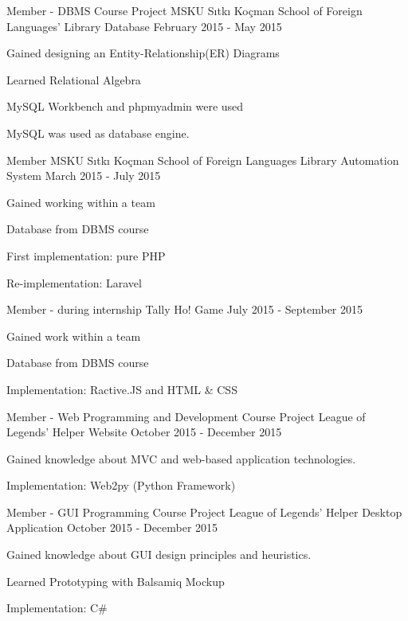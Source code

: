 \begin{cventries}
  \cventry
    {Member - DBMS Course Project}
    {MSKU Sıtkı Koçman School of Foreign Languages' Library Database}
    {}
    {February 2015 - May 2015}
    {
      \begin{cvitems}
        \item {Gained designing an Entity-Relationship(ER) Diagrams}
        \item {Learned Relational Algebra}
        \item {MySQL Workbench and phpmyadmin were used}
        \item {MySQL was used as database engine.}
      \end{cvitems}
    }
  \cventry
    {Member}
    {MSKU Sıtkı Koçman School of Foreign Languages Library Automation System}
    {}
    {March 2015 - July 2015}
    {
      \begin{cvitems}
        \item {Gained working within a team}
        \item {Database from DBMS course}
        \item {First implementation: pure PHP}
        \item {Re-implementation: Laravel}
      \end{cvitems}
    }
  \cventry
    {Member - during internship}
    {Tally Ho! Game}
    {}
    {July 2015 - September 2015}
    {
      \begin{cvitems}
        \item {Gained work within a team}
        \item {Database from DBMS course}
        \item {Implementation: Ractive.JS and HTML \& CSS} 
      \end{cvitems}
    }
  \cventry
    {Member - Web Programming and Development Course Project}
    {League of Legends' Helper Website}
    {}
    {October 2015 - December 2015}
    {
      \begin{cvitems}
        \item {Gained knowledge about MVC and web-based application technologies.}
        \item {Implementation: Web2py (Python Framework)}
      \end{cvitems}
    }
  \cventry
    {Member - GUI Programming Course Project}
    {League of Legends' Helper Desktop Application}
    {}
    {October 2015 - December 2015}
    {
      \begin{cvitems}
        \item {Gained knowledge about GUI design principles and heuristics.}
        \item {Learned Prototyping with Balsamiq Mockup}
        \item {Implementation: C\#}
      \end{cvitems}
    }
\end{cventries}
